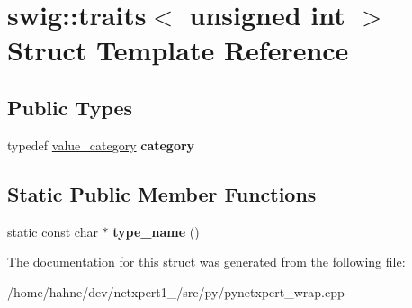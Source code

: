 \hypertarget{structswig_1_1traits_3_01unsigned_01int_01_4}{}\section{swig\+:\+:traits$<$ unsigned int $>$ Struct Template Reference}
\label{structswig_1_1traits_3_01unsigned_01int_01_4}
\subsection*{Public Types}
\begin{DoxyCompactItemize}
\item 
typedef \hyperlink{structswig_1_1value__category}{value\+\_\+category} {\bfseries category}\hypertarget{structswig_1_1traits_3_01unsigned_01int_01_4_adbf8449ea6a05ab607b5e8322725fa64}{}\label{structswig_1_1traits_3_01unsigned_01int_01_4_adbf8449ea6a05ab607b5e8322725fa64}

\end{DoxyCompactItemize}
\subsection*{Static Public Member Functions}
\begin{DoxyCompactItemize}
\item 
static const char $\ast$ {\bfseries type\+\_\+name} ()\hypertarget{structswig_1_1traits_3_01unsigned_01int_01_4_ae122f101d5fb6e502d0c6671d55bfcaa}{}\label{structswig_1_1traits_3_01unsigned_01int_01_4_ae122f101d5fb6e502d0c6671d55bfcaa}

\end{DoxyCompactItemize}


The documentation for this struct was generated from the following file\+:\begin{DoxyCompactItemize}
\item 
/home/hahne/dev/netxpert1\+\_/src/py/pynetxpert\+\_\+wrap.\+cpp\end{DoxyCompactItemize}

